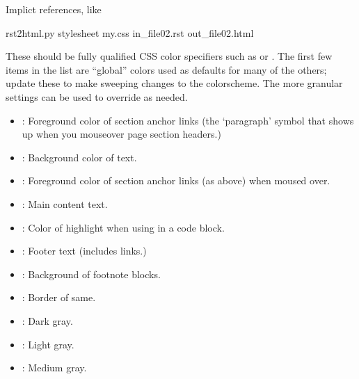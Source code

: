 \documentclass[letterpaper,10pt,english]{sphinxmanual}
\begin{document}
Implict references, like {\hyperref[\detokenize{in_file02:hello-abc}]{}}

rst2html.py  \textendash{}stylesheet my.css    in\_file02.rst  out\_file02.html

These should be fully qualified CSS color specifiers such as  or
. The first few items in the list are “global” colors used as defaults
for many of the others; update these to make sweeping changes to the
colorscheme. The more granular settings can be used to override as needed.
\begin{itemize}
\item {} 
: Foreground color of section anchor links (the ‘paragraph’
symbol that shows up when you mouseover page section headers.)

\item {} 
: Background color of  text.

\item {} 
: Foreground color of section anchor links (as above)
when moused over.

\item {} 
: Main content text.

\item {} 
: Color of highlight when using  in a code block.

\item {} 
: Footer text (includes links.)

\item {} 
: Background of footnote blocks.

\item {} 
: Border of same.

\item {} 
: Dark gray.

\item {} 
: Light gray.

\item {} 
: Medium gray.


\end{itemize}
\end{document}
